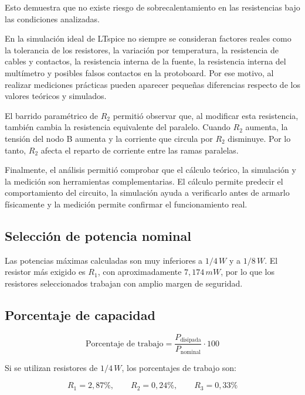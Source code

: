 \documentclass[a4paper,12pt]{article}
\begin{document}
	Esto demuestra que no existe riesgo de sobrecalentamiento en las resistencias bajo las condiciones
	analizadas.
	
	En la simulación ideal de LTspice no siempre se consideran factores reales como la tolerancia de los
	resistores, la variación por temperatura, la resistencia de cables y contactos, la resistencia interna de
	la fuente, la resistencia interna del multímetro y posibles falsos contactos en la protoboard. Por ese
	motivo, al realizar mediciones prácticas pueden aparecer pequeñas diferencias respecto de los valores
	teóricos y simulados.
	
	El barrido paramétrico de $R_2$ permitió observar que, al modificar esta resistencia, también cambia
	la resistencia equivalente del paralelo. Cuando $R_2$ aumenta, la tensión del nodo B aumenta y la
	corriente que circula por $R_2$ disminuye. Por lo tanto, $R_2$ afecta el reparto de corriente entre las
	ramas paralelas.
	
	Finalmente, el análisis permitió comprobar que el cálculo teórico, la simulación y la medición son
	herramientas complementarias. El cálculo permite predecir el comportamiento del circuito, la simulación
	ayuda a verificarlo antes de armarlo físicamente y la medición permite confirmar el funcionamiento real.
	
	
	
	\subsection*{Selección de potencia nominal}
	
	Las potencias máximas calculadas son muy inferiores a $1/4\,W$ y a $1/8\,W$.
	El resistor más exigido es $R_1$, con aproximadamente $7,174\,mW$, por lo que
	los resistores seleccionados trabajan con amplio margen de seguridad.
	
	\subsection*{Porcentaje de capacidad}
	
	\[
	\text{Porcentaje de trabajo} =
	\frac{P_{\text{disipada}}}{P_{\text{nominal}}} \cdot 100
	\]
	
	Si se utilizan resistores de $1/4\,W$, los porcentajes de trabajo son:
	
	\[
	R_1 = 2,87\%, \qquad R_2 = 0,24\%, \qquad R_3 = 0,33\%
	\]
	
\end{document}
